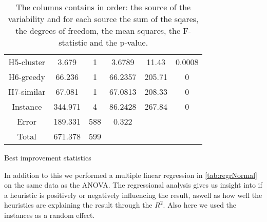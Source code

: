 \documentclass[../main.tex]{subfiles}
\begin{document}
\begin{table}
\begin{adjustbox}{width=\columnwidth,center}
\begin{subtable}{.75\columnwidth}
\begin{tabular}{cccccc}
            H5-cluster      & 3.679     & 1 & 3.6789    & 11.43 & 0.0008\\
            H6-greedy      & 66.236    & 1 & 66.2357   & 205.71& 0     \\
            H7-similar      & 67.081    & 1 & 67.0813   & 208.33& 0     \\
            Instance& 344.971   & 4 & 86.2428   & 267.84& 0     \\
            Error   & 189.331   &588& 0.322     &       &       \\
            Total   & 671.378   &599&           &       &       \\
            \hline
            \end{tabular}
        \caption{Best improvement statistics}
        \label{tab:anovaBestNormal}
        \end{subtable}
    \end{adjustbox}
    \label{tab:anovaNormal}
    \caption*{The columns contains in order: the source of the variability and for each source the sum of the sqares, the degrees of freedom, the mean squares, the F-statistic and the p-value.}
\end{table}

In addition to this we performed a multiple linear regression in \cref{tab:regrNormal} on the same data as the ANOVA.
The regressional analysis gives us insight into if a heuristic is positively or negatively influencing the result, aswell as how well the heuristics are explaining the result through the $R^2$.
Also here we used the instances as a random effect.
\end{document}
